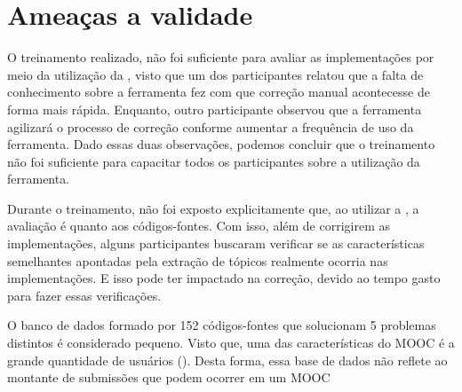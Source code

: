 %	
%	
%
%
%

	\section{Ameaças a validade}
	\label{sec:ameacas}
	
		O treinamento realizado, não foi suficiente para avaliar as implementações por meio
		da utilização da , visto que um dos participantes relatou que
		a falta de conhecimento sobre a ferramenta fez com que correção manual acontecesse de
		forma mais rápida. Enquanto, outro participante observou que a ferramenta agilizará
		o processo de correção conforme aumentar a frequência de uso da ferramenta. Dado
		essas duas observações, podemos concluir que o treinamento não foi suficiente para
		capacitar todos os participantes sobre a utilização da ferramenta.
		
		Durante o treinamento, não foi exposto explicitamente que, ao utilizar a ,
		a avaliação é quanto aos códigos-fontes. Com isso, além de corrigirem as implementações,
		alguns participantes buscaram verificar se as características semelhantes apontadas
		pela extração de tópicos realmente ocorria nas implementações. E isso pode ter
		impactado na correção, devido ao tempo gasto para fazer essas verificações.
		
		O banco de dados formado por 152 códigos-fontes que solucionam 5 problemas distintos
		é considerado pequeno. Visto que, uma das características do \ac{MOOC} é a grande
		quantidade de usuários (). Desta forma, essa base de dados não
		reflete ao montante de submissões que podem ocorrer em um \acs{MOOC}
		
